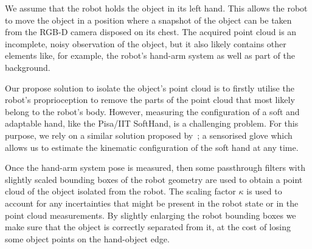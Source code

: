 
We assume that the robot holds the object in its left hand. This allows the robot to move the object in a position where a snapshot of the object can be taken from the RGB-D camera disposed on its chest. 
The acquired point cloud is an incomplete, noisy observation of the object, but it also likely contains other elements like, for example, the robot's hand-arm system as well as part of the background. 

Our propose solution to isolate the object's point cloud is to firstly utilise the robot's proprioception to remove the parts of the point cloud that most likely belong to the robot's body. However, measuring  the  configuration of  a  soft and  adaptable hand, like the Pisa/IIT SoftHand, is a challenging problem. For this purpose, we rely on a similar solution proposed by~\citet{Santaera2015Lowcost}; a sensorised glove which allows us to estimate the kinematic configuration of the soft hand at any time.

Once the hand-arm  system pose is measured, then
some   passthrough filters with slightly  scaled bounding boxes of  the robot
geometry  are used  to obtain  a  point cloud  of  the object  isolated from  the
robot. The scaling factor $\kappa$ is used to account for any incertainties that might
be present in the robot state or in the point cloud measurements. 
By slightly enlarging the robot bounding boxes we make sure that the object is correctly
separated from it, at the cost of losing some object points on the hand-object edge.


